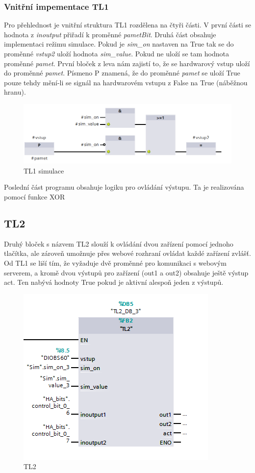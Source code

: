 \documentclass[a4paper,12pt,czech,bibliography=totoc]{scrbook}
\begin{document}
\subsubsection{Vnitřní impementace TL1}
Pro přehlednost je vnitřní struktura TL1 rozdělena na čtyři části.
V první části se hodnota z \textit{inoutput} přiřadí k proměnné \textit{pametBit}. 
\newline
Druhá část obsahuje implementaci režimu simulace. Pokud je \textit{sim\_on} nastaven na True tak se do proměnné \textit{vstup2} uloží hodnota \textit{sim\_value}. Pokud ne uloží se tam hodnota proměnné \textit{pamet}. První bloček z leva nám zajistí to, že se hardwarový vstup uloží do proměnné \textit{pamet}. Písmeno P znamená, že do proměnné \textit{pamet} se uloží True pouze tehdy mění-li se signál na hardwarovém vstupu z False na True (náběžnou hranu).
\begin{figure}[h]
	\centering
	\includegraphics[scale = 0.8]{TL1_s2.PNG}
	\caption{TL1 simulace}
	\label{fig:my_label}
\end{figure}
Poslední část programu obsahuje logiku pro ovládání výstupu. Ta je realizována pomocí funkce XOR

\subsection{TL2}
Druhý bloček s názvem TL2 slouží k ovládání dvou zařízení pomocí jednoho tlačítka, ale zároveň umožnuje přes webové rozhraní ovládat každé zařízení zvlášť.
Od TL1 se liší tím, že vyžaduje dvě proměnné pro komunikaci s webovým serverem, a kromě dvou výstupů pro zařízení (out1 a out2) obsahuje ještě výstup act. Ten nabývá hodnoty True pokud je aktivní alespoň jeden z výstupů.
\newpage
\begin{figure}[h]
	\centering
	\includegraphics[scale = 1]{TL2.PNG}
	\caption{TL2}
	\label{fig:my_label}
\end{figure}
\end{document}
